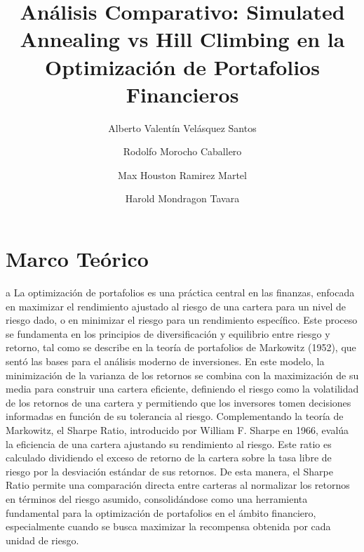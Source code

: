 \documentclass[9pt,a4paper,twoside]{rho-class/rho}
\title{ Análisis Comparativo: Simulated Annealing vs Hill Climbing en la Optimización de Portafolios Financieros }
\author[,$\dagger$]{Alberto Valentín Velásquez Santos}
\author[,$\dagger$]{Rodolfo Morocho Caballero}
\author[,$\dagger$]{Max Houston Ramirez Martel}
\author[,$\dagger$]{Harold Mondragon Tavara}
\affil[$\dagger$]{Estos autores contribuyeron igualmente a este trabajo.}
\begin{document}
	
    \maketitle
    \section{Marco Teórico}

        a La optimización de portafolios es una práctica central en las finanzas, enfocada en maximizar el rendimiento ajustado al riesgo de una cartera para un nivel de riesgo dado, o en minimizar el riesgo para un rendimiento específico. Este proceso se fundamenta en los principios de diversificación y equilibrio entre riesgo y retorno, tal como se describe en la teoría de portafolios de Markowitz (1952), que sentó las bases para el análisis moderno de inversiones. En este modelo, la minimización de la varianza de los retornos se combina con la maximización de su media para construir una cartera eficiente, definiendo el riesgo como la volatilidad de los retornos de una cartera y permitiendo que los inversores tomen decisiones informadas en función de su tolerancia al riesgo.
        Complementando la teoría de Markowitz, el Sharpe Ratio, introducido por William F. Sharpe en 1966, evalúa la eficiencia de una cartera ajustando su rendimiento al riesgo. Este ratio es calculado dividiendo el exceso de retorno de la cartera sobre la tasa libre de riesgo por la desviación estándar de sus retornos. De esta manera, el Sharpe Ratio permite una comparación directa entre carteras al normalizar los retornos en términos del riesgo asumido, consolidándose como una herramienta fundamental para la optimización de portafolios en el ámbito financiero, especialmente cuando se busca maximizar la recompensa obtenida por cada unidad de riesgo.
\end{document}
